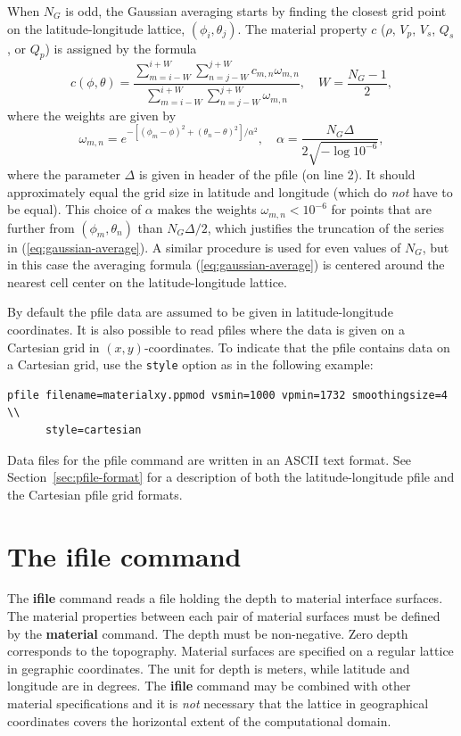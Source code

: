 \documentclass[11pt]{report}
\begin{document}
{When $N_G$ is odd, the Gaussian averaging starts by finding the closest grid point on the
latitude-longitude lattice, $(\phi_i,\theta_j)$. The material property $c$ ($\rho$, $V_p$, $V_s$,
$Q_s$, or $Q_p$) is assigned by the formula
\begin{equation}\label{eq:gaussian-average}
	c(\phi,\theta) = \dfrac{ \sum_{m=i-W}^{i+W} \sum_{n=j-W}^{j+W} c_{m,n} \omega_{m,n} }
	{ \sum_{m=i-W}^{i+W} \sum_{n=j-W}^{j+W} \omega_{m,n} },\quad W = \frac{N_G-1}{2},
\end{equation}
where the weights are given by
\[
	\omega_{m,n} = e^{-[(\phi_m-\phi)^2 + (\theta_n-\theta)^2]/\alpha^2},\quad \alpha = \frac{N_G \Delta}{2
		\sqrt{-\log 10^{-6}}},
\]
where the parameter $\Delta$ is given in header of the pfile (on line 2). It should approximately equal the
grid size in latitude and longitude (which do {\em not} have to be equal). This choice of $\alpha$ makes
the weights $\omega_{m,n}<10^{-6}$ for points that are further from $(\phi_m, \theta_n)$ than $N_G
	\Delta/2$, which justifies the truncation of the series in (\ref{eq:gaussian-average}). A
similar procedure is used for even values of $N_G$, but in this case the averaging formula
(\ref{eq:gaussian-average}) is centered around the nearest cell center on the latitude-longitude
lattice.

By default the pfile data are assumed to be given in latitude-longitude coordinates. It is also
possible to read pfiles where the data is given on a Cartesian grid in $(x, y)$-coordinates. To
indicate that the pfile contains data on a  Cartesian grid, use the {\tt style}
option as in the following example:
\begin{verbatim}
pfile filename=materialxy.ppmod vsmin=1000 vpmin=1732 smoothingsize=4 \\
      style=cartesian
\end{verbatim}

Data files for the pfile command are written in an ASCII text format. See
Section~\ref{sec:pfile-format} for a description of both the latitude-longitude pfile and the
Cartesian pfile grid formats.

\section{The ifile command}\label{sec:ifile}
The {\bf ifile} command reads a file holding the depth to material interface surfaces. The material
properties between each pair of material surfaces must be defined by the {\bf material} command. The
depth must be non-negative. Zero depth corresponds to the topography. Material surfaces are
specified on a regular lattice in gegraphic coordinates. The unit for depth is meters, while
latitude and longitude are in degrees. The {\bf ifile} command may be combined with other material
specifications and it is {\em not} necessary that the lattice in geographical coordinates covers the
horizontal extent of the computational domain.

}
\end{document}
